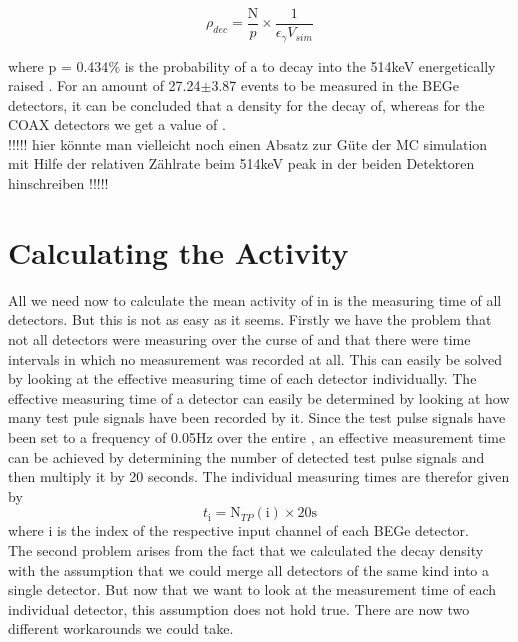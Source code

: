 \begin{equation}
\rho_{dec} = \frac{\mathrm{N}}{p}\times\frac{1}{\epsilon_\gamma V_{sim}}
\label{equ:density}
\end{equation}

where p = 0.434$\%$ is the probability of a \Kr to decay into the 514keV energetically raised .
For an amount of 27.24\(\pm\)3.87 events to be measured in the BEGe detectors, it can be concluded that a density for the \Kr decay of, whereas for the COAX detectors we get a value of . 
\\

!!!!! hier könnte man vielleicht noch einen Absatz zur Güte der MC simulation mit Hilfe der relativen Zählrate beim 514keV peak in der beiden Detektoren hinschreiben !!!!!
\\

\section{Calculating the Activity}
\label{sec:CalcActiv}

All we need now to calculate the mean activity of \Kr in \PII is the measuring time of all detectors.
But this is not as easy as it seems.
Firstly we have the problem that not all detectors were measuring over the curse of \PII and that there were time intervals in which no measurement was recorded at all.
This can easily be solved by looking at the effective measuring time of each detector individually.
The effective measuring time of a detector can easily be determined by looking at how many test pule signals have been recorded by it. 
Since the test pulse signals have been set to a frequency of 0.05Hz over the entire \PII, an effective measurement time can be achieved by determining the number of detected test pulse signals and then multiply it by 20 seconds.
The individual measuring times are therefor given by
\begin{equation*}
    t_\mathrm{i} = \mathrm{N}_{TP}(\mathrm{i}) \times 20\mathrm{s}
\end{equation*}
where i is the index of the respective input channel of each BEGe detector.
\\

The second problem arises from the fact that we calculated the decay density with the assumption that we could merge all detectors of the same kind into a single detector.
But now that we want to look at the measurement time of each individual detector, this assumption does not hold true.
There are now two different workarounds we could take.
\\

